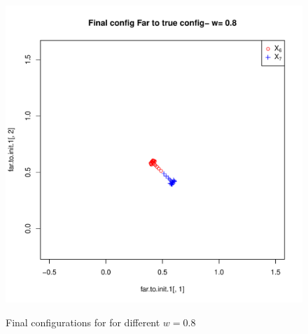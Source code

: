 \documentclass[12pt,oneside,final]{thesis}\usepackage[]{graphicx}\usepackage[]{color}
\begin{document}
\begin{figure}
\begin{minipage}[b]{0.5\linewidth}
\end{minipage}
\hspace{0.5cm}
\begin{minipage}[b]{0.5\linewidth}
\centering
\includegraphics[scale=0.45]{other-min-w0_8.pdf}
\label{fig:Finalconfig-MultMin-w-0_8_a}


\end{minipage}

\caption{Final configurations for for different $w=0.8$ }
\label{fig:Finalconfig-MultMin-w-0_8}

\end{figure}
\end{document}
